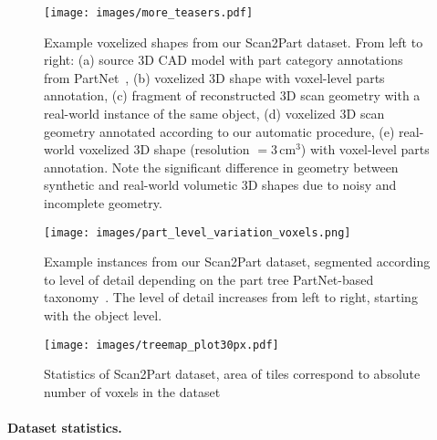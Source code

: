 
\begin{figure}[!t]
\label{fig:more_teasers}
\centering
\texttt{[image: images/more\_teasers.pdf]}
\caption{Example voxelized shapes from our Scan2Part dataset. From left to right: 
(a) source 3D CAD model with part category annotations from PartNet~\cite{mo2019partnet},
(b) voxelized 3D shape with voxel-level parts annotation,
(c) fragment of reconstructed 3D scan geometry with a real-world instance of the same object,
(d) voxelized 3D scan geometry annotated according to our automatic procedure,
(e) real-world voxelized 3D shape (resolution $=3$\,cm$^3$) with voxel-level parts annotation.
Note the significant difference in geometry between synthetic and real-world volumetic 3D shapes due to noisy and incomplete geometry.}
\end{figure}


\begin{figure}[!t]
\label{fig:part_level_variation_voxels}
\centering
\texttt{[image: images/part\_level\_variation\_voxels.png]}
\caption{Example instances from our Scan2Part dataset, segmented according to level of detail depending on the part tree PartNet-based taxonomy~\cite{mo2019partnet}. The level of detail  increases from left to right, starting with the object level.}
\end{figure}


\begin{figure}[!t]
\label{fig:dataset_treemap}
\centering
\texttt{[image: images/treemap\_plot30px.pdf]}
\caption{Statistics of Scan2Part dataset, area of tiles correspond to absolute number of voxels in the dataset}
\end{figure}


\paragraph{Dataset statistics. }
\label{dataset:statistics-detail}




